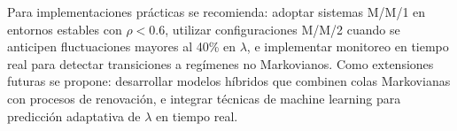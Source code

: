 \documentclass[12pt, a4paper]{article}
\begin{document}
    Para implementaciones prácticas se recomienda: adoptar sistemas M/M/1 en entornos estables con $\rho < 0.6$, utilizar configuraciones M/M/2 cuando se anticipen fluctuaciones mayores al 40\% en $\lambda$, e implementar monitoreo en tiempo real para detectar transiciones a regímenes no Markovianos. Como extensiones futuras se propone: desarrollar modelos híbridos que combinen colas Markovianas con procesos de renovación, e integrar técnicas de machine learning para predicción adaptativa de $\lambda$ en tiempo real.
	
\end{document}
